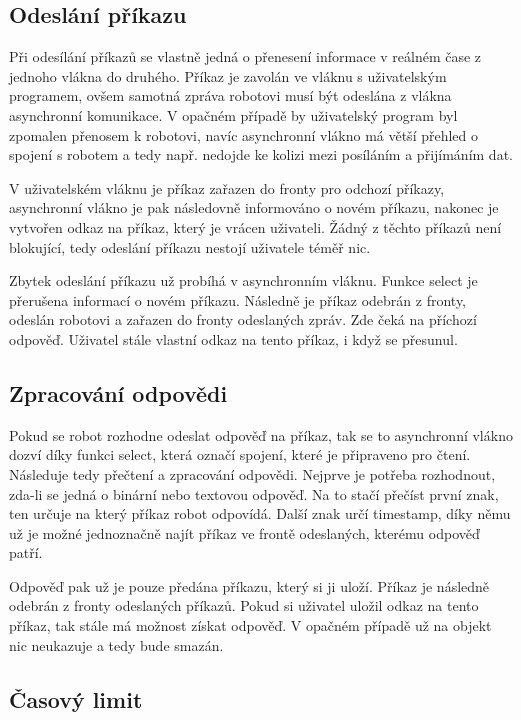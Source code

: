 \documentclass[12pt,notitlepage]{report}
\begin{document}
    \subsection{Odeslání příkazu}

    Při odesílání příkazů se vlastně jedná o přenesení informace v reálném čase
    z jednoho vlákna do druhého. Příkaz je zavolán ve vláknu s uživatelským
    programem, ovšem samotná zpráva robotovi musí být odeslána z vlákna
    asynchronní komunikace. V opačném případě by uživatelský program byl
    zpomalen přenosem k robotovi, navíc asynchronní vlákno má větší přehled o
    spojení s robotem a tedy např. nedojde ke kolizi mezi posíláním a
    přijímáním dat.

    V uživatelském vláknu je příkaz zařazen do fronty pro odchozí příkazy,
    asynchronní vlákno je pak následovně informováno o novém příkazu, nakonec
    je vytvořen odkaz na příkaz, který je vrácen uživateli. Žádný z těchto
    příkazů není blokující, tedy odeslání příkazu nestojí uživatele téměř nic.

    Zbytek odeslání příkazu už probíhá v asynchronním vláknu. Funkce select je
    přerušena informací o novém příkazu. Následně je příkaz odebrán z fronty,
    odeslán robotovi a zařazen do fronty odeslaných zpráv. Zde čeká na příchozí
    odpověď. Uživatel stále vlastní odkaz na tento příkaz, i když se přesunul.

    \subsection{Zpracování odpovědi}

    Pokud se robot rozhodne odeslat odpověď na příkaz, tak se to asynchronní
    vlákno dozví díky funkci select, která označí spojení, které je připraveno
    pro čtení. Následuje tedy přečtení a zpracování odpovědi. Nejprve je
    potřeba rozhodnout, zda-li se jedná o binární nebo textovou odpověď. Na to
    stačí přečíst první znak, ten určuje na který příkaz robot odpovídá. Další
    znak určí timestamp, díky němu už je možné jednoznačně najít příkaz ve
    frontě odeslaných, kterému odpověď patří.

    Odpověď pak už je pouze předána příkazu, který si ji uloží. Příkaz je
    následně odebrán z fronty odeslaných příkazů. Pokud si uživatel uložil
    odkaz na tento příkaz, tak stále má možnost získat odpověď. V opačném
    případě už na objekt nic neukazuje a tedy bude smazán.

    \subsection{Časový limit}
\end{document}
